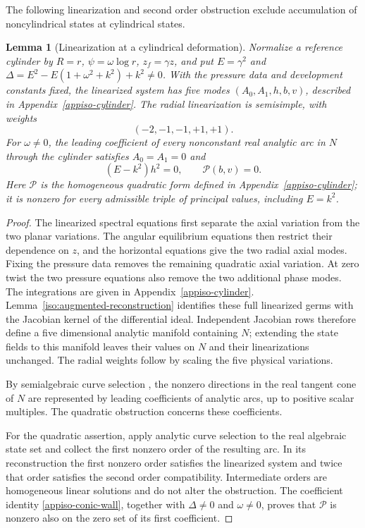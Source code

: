 \documentclass[11pt,a4paper]{article}
\numberwithin{equation}{section}
\theoremstyle{plain}
\newtheorem{lemma}[theorem]{Lemma}
\theoremstyle{definition}
\theoremstyle{remark}
\begin{document}
The following linearization and second order obstruction exclude
accumulation of noncylindrical states at cylindrical states.

\begin{lemma}[Linearization at a cylindrical deformation]
\label{iso:rr-linearization}
Normalize a reference cylinder by
$R=r$, $\psi=\omega\log r$, $z_f=\gamma z$, and put $E=\gamma^2$ and
$\Delta=E^2-E(1+\omega^2+k^2)+k^2\ne0$.
With the pressure data and development constants fixed, the
linearized system has five modes $(A_0,A_1,h,b,v)$, described in
Appendix~\ref{appiso-cylinder}. The radial linearization is semisimple,
with weights
\begin{equation}\label{iso:rr-weights}
                     (-2,-1,-1,+1,+1).
\end{equation}
For $\omega\ne0$, the leading coefficient of every nonconstant real
analytic arc in $N$ through the cylinder satisfies $A_0=A_1=0$ and
\begin{equation}\label{iso:rr-second}
 (E-k^2)h^2=0,\qquad \mathscr P(b,v)=0.
\end{equation}
Here $\mathscr P$ is the homogeneous quadratic form defined in
Appendix~\ref{appiso-cylinder}; it is nonzero for every admissible
triple of principal values, including $E=k^2$.
\end{lemma}
\begin{proof}
The linearized spectral equations first separate the axial variation
from the two planar variations. The angular equilibrium equations
then restrict their dependence on $z$, and the horizontal equations
give the two radial axial modes. Fixing the pressure data
removes the remaining quadratic axial variation. At zero twist the
two pressure equations also remove the two additional phase modes.
The integrations are given in Appendix~\ref{appiso-cylinder}.
Lemma~\ref{iso:augmented-reconstruction} identifies these full
linearized germs with the Jacobian kernel of the differential ideal.
Independent Jacobian rows therefore define a five dimensional analytic
manifold containing $N$; extending the state fields to this manifold
leaves their values on $N$ and their linearizations unchanged.
The radial weights follow by scaling the five physical variations.

By semialgebraic curve selection
\cite[Theorem~2.5.5 and Proposition~8.1.13]{BochnakCosteRoy1998}, the nonzero directions in
the real tangent cone of $N$ are represented by leading coefficients
of analytic arcs, up to positive scalar multiples. The quadratic
obstruction concerns these coefficients.

For the quadratic assertion, apply analytic curve selection to
the real algebraic state set and collect the first nonzero
order of the resulting arc. In its reconstruction the first
nonzero order satisfies the linearized system and twice that order
satisfies the second order compatibility. Intermediate orders are
homogeneous linear solutions and do not alter the obstruction.
The coefficient identity \eqref{appiso-conic-wall}, together with
$\Delta\ne0$ and $\omega\ne0$, proves that $\mathscr P$ is nonzero
also on the zero set of its first coefficient.
\end{proof}
\end{document}

